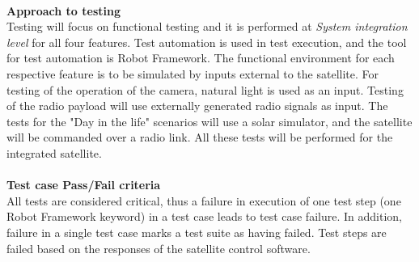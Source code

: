 \documentclass[english,12pt,a4paper,pdftex,elec,utf8]{aaltothesis}
\begin{document}
\\
\textbf{Approach to testing} 
\\
Testing will focus on functional testing and it is performed at \textit{System integration level} for all four features. Test automation is used in test execution, and the tool for test automation is Robot Framework. The functional environment for each respective feature is to be simulated by inputs external to the satellite. For testing of the operation of the camera, natural light is used as an input. Testing of the radio payload will use externally generated radio signals as input. The tests for the "Day in the life" scenarios will use a solar simulator, and the satellite will be commanded over a radio link. All these tests will be performed for the integrated satellite.
\\
\\
\textbf{Test case Pass/Fail criteria} 
\\
All tests are considered critical, thus a failure in execution of one test step (one Robot Framework keyword) in a test case leads to test case failure. In addition, failure in a single test case marks a test suite as having failed. Test steps are failed based on the responses of the satellite control software. 
\end{document}
